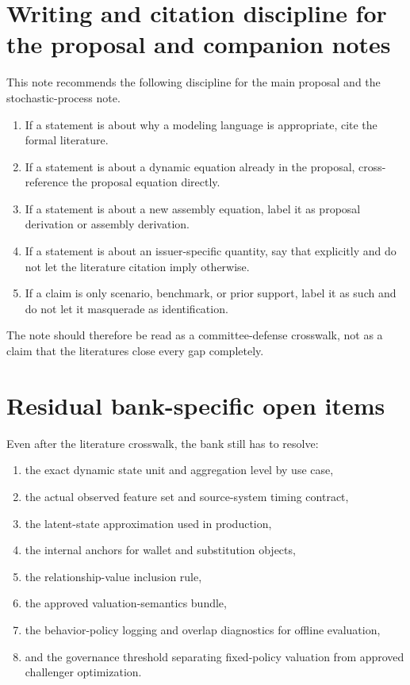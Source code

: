 \documentclass[11pt]{article}
\begin{document}
\section{Writing and citation discipline for the proposal and companion notes}

This note recommends the following discipline for the main proposal and the
stochastic-process note.
\begin{enumerate}[label=\arabic*.]
  \item If a statement is about why a modeling language is appropriate, cite the
        formal literature.
  \item If a statement is about a dynamic equation already in the proposal,
        cross-reference the proposal equation directly.
  \item If a statement is about a new assembly equation, label it as proposal
        derivation or assembly derivation.
  \item If a statement is about an issuer-specific quantity, say that explicitly
        and do not let the literature citation imply otherwise.
  \item If a claim is only scenario, benchmark, or prior support, label it as
        such and do not let it masquerade as identification.
\end{enumerate}

The note should therefore be read as a committee-defense crosswalk, not as a
claim that the literatures close every gap completely.

\section{Residual bank-specific open items}

Even after the literature crosswalk, the bank still has to resolve:
\begin{enumerate}[label=\arabic*.]
  \item the exact dynamic state unit and aggregation level by use case,
  \item the actual observed feature set and source-system timing contract,
  \item the latent-state approximation used in production,
  \item the internal anchors for wallet and substitution objects,
  \item the relationship-value inclusion rule,
  \item the approved valuation-semantics bundle,
  \item the behavior-policy logging and overlap diagnostics for offline
        evaluation,
  \item and the governance threshold separating fixed-policy valuation from
        approved challenger optimization.
\end{enumerate}
\end{document}
